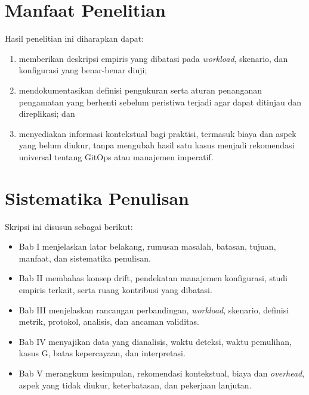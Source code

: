 \section{Manfaat Penelitian}

Hasil penelitian ini diharapkan dapat:
\begin{enumerate}
  \item memberikan deskripsi empiris yang dibatasi pada \textit{workload}, skenario, dan konfigurasi yang benar-benar diuji;
  \item mendokumentasikan definisi pengukuran serta aturan penanganan pengamatan yang berhenti sebelum peristiwa terjadi agar dapat ditinjau dan direplikasi; dan
  \item menyediakan informasi kontekstual bagi praktisi, termasuk biaya dan aspek yang belum diukur, tanpa mengubah hasil satu kasus menjadi rekomendasi universal tentang GitOps atau manajemen imperatif.
\end{enumerate}

\section{Sistematika Penulisan}

Skripsi ini disusun sebagai berikut:
\begin{itemize}
  \item Bab I menjelaskan latar belakang, rumusan masalah, batasan, tujuan, manfaat, dan sistematika penulisan.
  \item Bab II membahas konsep drift, pendekatan manajemen konfigurasi, studi empiris terkait, serta ruang kontribusi yang dibatasi.
  \item Bab III menjelaskan rancangan perbandingan, \textit{workload}, skenario, definisi metrik, protokol, analisis, dan ancaman validitas.
  \item Bab IV menyajikan data yang dianalisis, waktu deteksi, waktu pemulihan, kasus G, batas kepercayaan, dan interpretasi.
  \item Bab V merangkum kesimpulan, rekomendasi kontekstual, biaya dan \textit{overhead}, aspek yang tidak diukur, keterbatasan, dan pekerjaan lanjutan.
\end{itemize}

